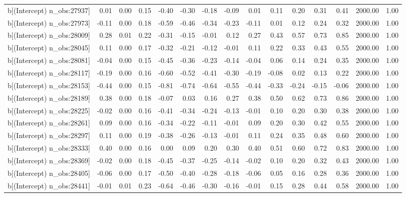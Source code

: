 \begin{table}[ht]
\begin{tabular}{rrrrrrrrrrrrrrr}
  b[(Intercept) n\_obs:27937] & 0.01 & 0.00 & 0.15 & -0.40 & -0.30 & -0.18 & -0.09 & 0.01 & 0.11 & 0.20 & 0.31 & 0.41 & 2000.00 & 1.00 \\ 
  b[(Intercept) n\_obs:27973] & -0.11 & 0.00 & 0.18 & -0.59 & -0.46 & -0.34 & -0.23 & -0.11 & 0.01 & 0.12 & 0.24 & 0.32 & 2000.00 & 1.00 \\ 
  b[(Intercept) n\_obs:28009] & 0.28 & 0.01 & 0.22 & -0.31 & -0.15 & -0.01 & 0.12 & 0.27 & 0.43 & 0.57 & 0.73 & 0.85 & 2000.00 & 1.00 \\ 
  b[(Intercept) n\_obs:28045] & 0.11 & 0.00 & 0.17 & -0.32 & -0.21 & -0.12 & -0.01 & 0.11 & 0.22 & 0.33 & 0.43 & 0.55 & 2000.00 & 1.00 \\ 
  b[(Intercept) n\_obs:28081] & -0.04 & 0.00 & 0.15 & -0.45 & -0.36 & -0.23 & -0.14 & -0.04 & 0.06 & 0.14 & 0.24 & 0.35 & 2000.00 & 1.00 \\ 
  b[(Intercept) n\_obs:28117] & -0.19 & 0.00 & 0.16 & -0.60 & -0.52 & -0.41 & -0.30 & -0.19 & -0.08 & 0.02 & 0.13 & 0.22 & 2000.00 & 1.00 \\ 
  b[(Intercept) n\_obs:28153] & -0.44 & 0.00 & 0.15 & -0.81 & -0.74 & -0.64 & -0.55 & -0.44 & -0.33 & -0.24 & -0.15 & -0.06 & 2000.00 & 1.00 \\ 
  b[(Intercept) n\_obs:28189] & 0.38 & 0.00 & 0.18 & -0.07 & 0.03 & 0.16 & 0.27 & 0.38 & 0.50 & 0.62 & 0.73 & 0.86 & 2000.00 & 1.00 \\ 
  b[(Intercept) n\_obs:28225] & -0.02 & 0.00 & 0.16 & -0.41 & -0.34 & -0.24 & -0.13 & -0.01 & 0.10 & 0.20 & 0.30 & 0.38 & 2000.00 & 1.00 \\ 
  b[(Intercept) n\_obs:28261] & 0.09 & 0.00 & 0.16 & -0.34 & -0.22 & -0.11 & -0.01 & 0.09 & 0.20 & 0.30 & 0.42 & 0.55 & 2000.00 & 1.00 \\ 
  b[(Intercept) n\_obs:28297] & 0.11 & 0.00 & 0.19 & -0.38 & -0.26 & -0.13 & -0.01 & 0.11 & 0.24 & 0.35 & 0.48 & 0.60 & 2000.00 & 1.00 \\ 
  b[(Intercept) n\_obs:28333] & 0.40 & 0.00 & 0.16 & 0.00 & 0.09 & 0.20 & 0.30 & 0.40 & 0.51 & 0.60 & 0.72 & 0.83 & 2000.00 & 1.00 \\ 
  b[(Intercept) n\_obs:28369] & -0.02 & 0.00 & 0.18 & -0.45 & -0.37 & -0.25 & -0.14 & -0.02 & 0.10 & 0.20 & 0.32 & 0.43 & 2000.00 & 1.00 \\ 
  b[(Intercept) n\_obs:28405] & -0.06 & 0.00 & 0.17 & -0.50 & -0.40 & -0.28 & -0.18 & -0.06 & 0.05 & 0.16 & 0.28 & 0.36 & 2000.00 & 1.00 \\ 
  b[(Intercept) n\_obs:28441] & -0.01 & 0.01 & 0.23 & -0.64 & -0.46 & -0.30 & -0.16 & -0.01 & 0.15 & 0.28 & 0.44 & 0.58 & 2000.00 & 1.00 \\ 

\end{tabular}
\end{table}
